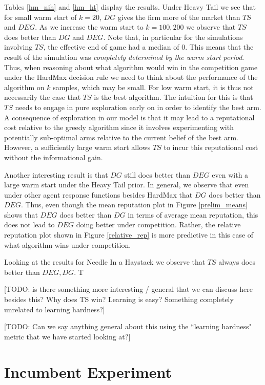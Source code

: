 \documentclass{article}
\theoremstyle{definition}
\begin{document}
Tables \ref{hm_nih} and \ref{hm_ht} display the results. Under Heavy Tail we see that for small warm start of $k = 20$, $DG$ gives the firm more of the market than $TS$ and $DEG$. As we increase the warm start to $k= 100, 200$ we observe that $TS$ does better than $DG$ and $DEG$. Note that, in particular for the simulations involving $TS$, the effective end of game had a median of 0. This means that the result of the simulation was \textit{completely determined by the warm start period}. Thus, when reasoning about what algorithm would win in the competition game under the HardMax decision rule we need to think about the performance of the algorithm on $k$ samples, which may be small. For low warm start, it is thus not necessarily the case that $TS$ is the best algorithm. The intuition for this is that $TS$ needs to engage in pure exploration early on in order to identify the best arm. A consequence of exploration in our model is that it may lead to a reputational cost relative to the greedy algorithm since it involves experimenting with potentially sub-optimal arms relative to the current belief of the best arm. However, a sufficiently large warm start allows $TS$ to incur this reputational cost without the informational gain.

Another interesting result is that $DG$ still does better than $DEG$ even with a large warm start under the Heavy Tail prior. In general, we observe that even under other agent response functions besides HardMax that $DG$ does better than $DEG$. Thus, even though the mean reputation plot in Figure \ref{prelim_means} shows that $DEG$ does better than $DG$ in terms of average mean reputation, this does not lead to $DEG$ doing better under competition. Rather, the relative reputation plot shown in Figure \ref{relative_rep} is more predictive in this case of what algorithm wins under competition.

Looking at the results for Needle In a Haystack we observe that $TS$ always does better than $DEG, DG$. T

[TODO: is there something more interesting / general that we can discuss here besides this? Why does TS win? Learning is easy? Something completely unrelated to learning hardness?]

[TODO: Can we say anything general about this using the ``learning hardness" metric that we have started looking at?]

\section{Incumbent Experiment}
\label{S:7}
\end{document}
